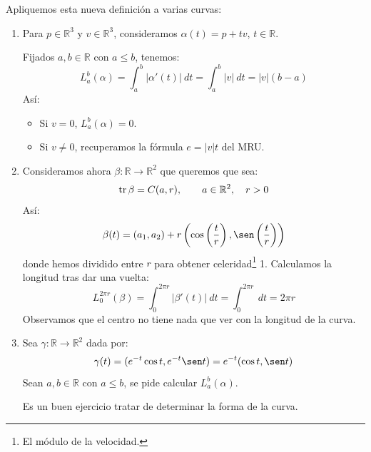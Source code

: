 \begin{ejemplo}
    Apliquemos esta nueva definición a varias curvas:
    \begin{enumerate}
        \item Para $p\in \mathbb{R}^3$ y $v\in \mathbb{R}^3$, consideramos $\alpha(t) = p+tv$, $t\in \mathbb{R}$.

            Fijados $a,b\in \mathbb{R}$ con $a\leq b$, tenemos:
            \begin{equation*}
                L_a^b(\alpha) = \int_{a}^{b} |\alpha'(t)|~dt  = \int_{a}^{b} |v|~dt  = |v|(b-a)
            \end{equation*}
            Así:
            \begin{itemize}
                \item Si $v=0$, $L_a^b(\alpha) = 0$.
                \item Si $v\neq 0$, recuperamos la fórmula $e = |v|t$ del MRU.
            \end{itemize}
        \item Consideramos ahora $\beta:\mathbb{R}\to \mathbb{R}^2$ que queremos que sea:
            \begin{equation*}
                \operatorname{tr} \beta = C(a,r), \qquad a\in \mathbb{R}^2,\quad  r>0
            \end{equation*}
            Así:
            \begin{equation*}
                \beta(t) = (a_1, a_2) + r\left(\cos\left(\frac{t}{r}\right), \sen\left(\frac{t}{r}\right)\right)
            \end{equation*}
            donde hemos dividido entre $r$ para obtener celeridad\footnote{El módulo de la velocidad.} 1. Calculamos la longitud tras dar una vuelta:
            \begin{equation*}
                L_0^{2\pi r}(\beta) = \int_{0}^{2\pi r} |\beta'(t)|~dt = \int_{0}^{2\pi r}~dt = 2\pi r
            \end{equation*}
            Observamos que el centro no tiene nada que ver con la longitud de la curva.
        \item Sea $\gamma:\mathbb{R}\to \mathbb{R}^2$ dada por:
            \begin{equation*}
                \gamma(t) = (e^{-t}\cos t, e^{-t}\sen t) = e^{-t}(\cos t, \sen t)
            \end{equation*}
            Sean $a,b\in \mathbb{R}$ con $a\leq b$, se pide calcular $L_a^b(\alpha)$.

            Es un buen ejercicio tratar de determinar la forma de la curva.


\end{enumerate}
\end{ejemplo}
